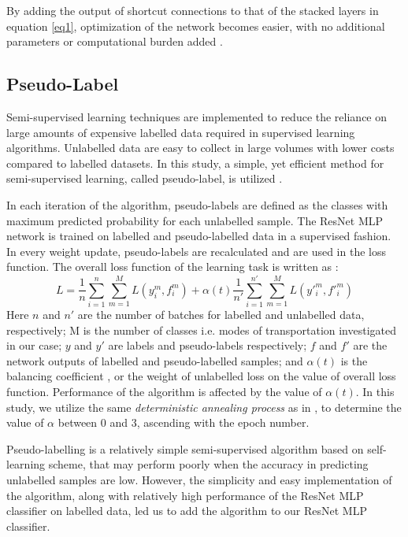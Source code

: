 By adding the output of shortcut connections to that of the stacked layers in equation \ref{eq1}, optimization of the network becomes easier, with no additional parameters or computational burden added \cite{he2016deep,he2016identity}. 

\subsection{Pseudo-Label}
Semi-supervised learning techniques are implemented to reduce the reliance on large amounts of expensive labelled data required in supervised learning algorithms. Unlabelled data are easy to collect in large volumes with lower costs compared to labelled datasets. In this study, a simple, yet efficient method for semi-supervised learning, called pseudo-label, is utilized \cite{lee2013pseudo}. 

In each iteration of the algorithm, pseudo-labels are defined as the classes with maximum predicted probability for each unlabelled sample.
The ResNet MLP network is trained on labelled and pseudo-labelled data in a supervised fashion. In every weight update, pseudo-labels are recalculated and are used in the loss function. The overall loss function of the learning task is written as \cite{lee2013pseudo}: 
\begin{equation}
    L=\frac{1}{n}\sum_{i=1}^{n}\sum_{m=1}^{M}L(y_i^m,f_i^m)+\alpha(t)	\frac{1}{n\prime}\sum_{i=1}^{n\prime}\sum_{m=1}^{M}L(y\prime _i^m,f\prime _i^m)
\end{equation}
Here $n$ and $n\prime$ are the number of batches for labelled and unlabelled data, respectively; M is the number of classes i.e. modes of transportation investigated in our case; $y$ and $y'$ are labels and pseudo-labels respectively; $f$ and $f'$ are the network outputs of labelled and pseudo-labelled samples; and $\alpha(t)$ is the balancing coefficient \cite{lee2013pseudo}, or the weight of unlabelled loss on the value of overall loss function. Performance of the algorithm is affected by the value of $\alpha(t)$. In this study, we utilize the same \textit{deterministic annealing process} as in \cite{lee2013pseudo}, to determine the value of $\alpha$ between 0 and 3, ascending with the epoch number.

Pseudo-labelling is a relatively simple semi-supervised algorithm based on self-learning scheme, that may perform poorly when the accuracy in predicting unlabelled samples are low. However, the simplicity and easy implementation of the algorithm, along with relatively high performance of the ResNet MLP classifier on labelled data, led us to add the algorithm to our ResNet MLP classifier. 